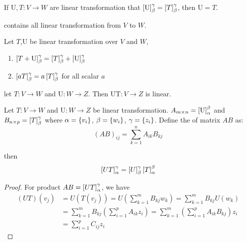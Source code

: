 \begin{theorem}
	If $\mathrm{U},T:V \rightarrow W$ are linear transformation that $\coordinate{\mathrm{U}}_\beta^\gamma = \coordinate{T}_\beta^\gamma$, then $\mathrm{U} = T$.
\end{theorem}

\begin{definition}
	 contains all linear transformation from $V$ to $W$.
\end{definition}

\begin{theorem}
	Let $T$,$\mathrm{U}$ be linear transformation over $V$ and $W$, 
	\begin{enumerate}
		\item $\coordinate{T + \mathrm{U}}_\beta^\gamma = \coordinate{T}_\beta^\gamma  + \coordinate{\mathrm{U}}_\beta^\gamma $
		\item $\coordinate{a T }_\beta^\gamma = a \coordinate{T}_\beta^\gamma $ for all scalar $a$
	\end{enumerate}
\end{theorem}

\begin{theorem}
	let $T:V\rightarrow W$ and $\mathrm{U}:W\rightarrow Z$. Then $\mathrm{UT}: V \rightarrow Z$ is linear.
\end{theorem}

\begin{definition}
	Let $T:V\rightarrow W$ and $\mathrm{U}:W\rightarrow Z$ be linear transformation. $A_{m \times n}=\coordinate{\mathrm{U}}_\alpha^\beta$ and $B_{n \times p}=\coordinate{T}_\beta^\gamma$ where $\alpha=\set{v_i}$, $\beta=\set{w_i}$, $\gamma=\set{z_i}$. Define the  of matrix $AB$ as:
	\begin{equation}
		(AB)_{ij} = \sum_{k=1}^n A_{ik} B_{kj}
	\end{equation}
	
	then 
	\begin{equation}
	    \coordinate{UT}_\alpha^\gamma = \coordinate{U}_\beta^\gamma \coordinate{T}_\alpha^\beta
	\end{equation}
\end{definition}

\begin{proof}
	For product $AB=\coordinate{UT}_\alpha^\gamma$, we have 
	\begin{equation}
		\begin{aligned}
			(UT)(v_j) &= U(T(v_j)) = U \left( \sum_{k=1}^m B_{kj} w_k \right) = \sum_{k=1}^m B_{kj} U(w_k) \\
			&= \sum_{k=1}^m B_{kj} \left( \sum_{i=1}^p A_{ik} z_i \right) = \sum_{k=1}^m  \left( \sum_{i=1}^p A_{ik} B_{kj} \right)  z_i \\
			&= \sum_{i=1}^p C_{ij} z_i
		\end{aligned}
	\end{equation}
\end{proof}


